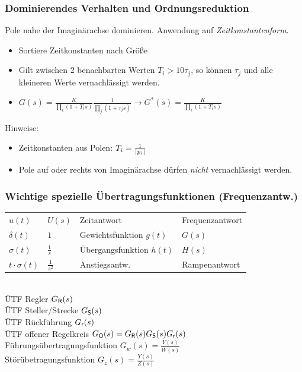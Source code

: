 \documentclass[fs, footer]{latex4ei}
\renewcommand{\i}{\mathrm{j}}
\begin{document}
\begin{multicols*}{4}
{	\subsubsection{Dominierendes Verhalten und Ordnungsreduktion}
	Pole nahe der Imaginärachse dominieren. Anwendung auf \emph{Zeitkonstantenform}.
	\begin{itemize}
		\item Sortiere Zeitkonstanten nach Größe
		\item Gilt zwischen 2 benachbarten Werten $T_i > 10 \tau_j$, so können $\tau_j$ und alle kleineren Werte vernachlässigt werden.
		\item $G(s) = \frac{K}{\prod\limits_{i}{(1 + T_i s)}} \frac{1}{\prod\limits_{j}{(1 + \tau_j s)}} \rightarrow G^*(s) = \frac{K}{\prod\limits_{i}{(1 + T_i s)}}$
	\end{itemize}
	Hinweise:
	\begin{itemize}
		\item Zeitkonstanten aus Polen: $T_i = \frac{1}{\left\vert p_i\right\vert}$
		\item Pole auf oder rechts von Imaginärachse dürfen \emph{nicht} vernachlässigt werden.
	\end{itemize}
	
	\subsubsection{Wichtige spezielle Übertragungsfunktionen (Frequenzantw.)}
	\begin{tabular}{@{}ll|ll}
		$u(t)$ & $U(s)$ & Zeitantwort & Frequenzantwort\\ \mrule
		$\delta(t)$ & $1$ & Gewichtsfunktion $g(t)$ & $G(s)$\\
		$\sigma(t)$ & $\frac{1}{s}$ & Übergangsfunktion $h(t)$ & $H(s)$\\ 
		$t \cdot \sigma(t)$ & $\frac{1}{s^2}$ & Anstiegsantw. & Rampenantwort\\
	\end{tabular}\\
	
	
	ÜTF Regler $G_{\sf R}(s)$\\
	ÜTF Steller/Strecke $G_{\sf S}(s)$\\
	ÜTF Rückführung $G_{\sf r}(s)$\\
	ÜTF offener Regelkreis $G_{\sf O}(s) = G_{\sf R}(s) G_{\sf S}(s) G_{\sf r}(s)$\\
	Führungsübertragungsfunktion $G_w(s) = \frac{Y(s)}{W(s)}$\\
	Störübetragungsfunktion $G_z(s) = \frac{Y(s)}{Z(s)}$\\
	
}
\end{multicols*}
\end{document}
